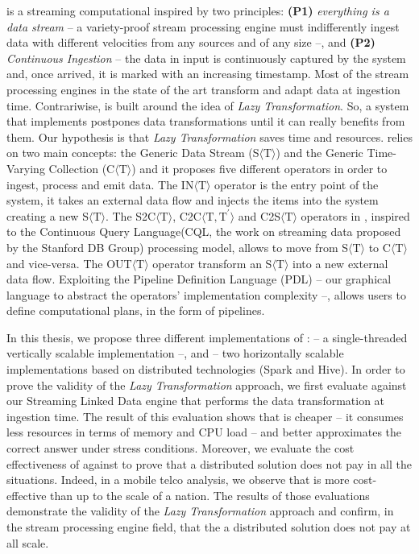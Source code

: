 \river{} is a streaming computational inspired by two principles: \textbf{(P1)} \textit{everything is a data stream} -- a variety-proof stream processing engine must indifferently ingest data with different velocities from any sources and of any size --, and \textbf{(P2)} \textit{Continuous Ingestion} -- the data in input is continuously captured by the system and, once arrived, it is marked with an increasing timestamp.
Most of the stream processing engines in the state of the art transform and adapt data at ingestion time.
Contrariwise, \river{} is built around the idea of \textit{Lazy Transformation}.
So, a system that implements \river{} postpones data transformations until it can really benefits from them.
Our hypothesis is that \textit{Lazy Transformation} saves time and resources.
\river{} relies on two main concepts: the Generic Data Stream (S$\langle\mathrm{T}\rangle$) and the Generic Time-Varying Collection (C$\langle\mathrm{T}\rangle$) and it proposes five different operators in order to ingest, process and emit data.
The IN$\langle\mathrm{T}\rangle$ operator is the entry point of the system, it takes an external data flow and injects the items into the system creating a new S$\langle\mathrm{T}\rangle$.
The S2C$\langle\mathrm{T}\rangle$, C2C$\langle\mathrm{T},\mathrm{T^{\prime}}\rangle$ and C2S$\langle\mathrm{T}\rangle$ operators in \river{}, inspired to the Continuous Query Language(CQL, the work on streaming data proposed by the Stanford DB Group) processing model, allows to move from S$\langle\mathrm{T}\rangle$ to C$\langle\mathrm{T}\rangle$ and vice-versa.
The OUT$\langle\mathrm{T}\rangle$ operator transform an S$\langle\mathrm{T}\rangle$ into a new external data flow.
Exploiting the Pipeline Definition Language (PDL) -- our graphical language to abstract the operators' implementation complexity --, \river{} allows users to define computational plans, in the form of pipelines.

In this thesis, we propose three different implementations of \river{}: \sti{} -- a single-threaded vertically scalable implementation --, \sparkdi{} and \hivedi{} -- two horizontally scalable implementations based on distributed technologies (Spark and Hive).
In order to prove the validity of the \textit{Lazy Transformation} approach, we first evaluate \sti{} against our Streaming Linked Data engine that performs the data transformation at ingestion time. The result of this evaluation shows that \sti{} is cheaper -- it consumes less resources in terms of memory and CPU load -- and better approximates the correct answer under stress conditions.
Moreover, we evaluate the cost effectiveness of \sti{} against \sparkdi{} to prove that a distributed solution does not pay in all the situations.
Indeed, in a mobile telco analysis, we observe that \sti{} is more cost-effective than \sparkdi{} up to the scale of a nation.
The results of those evaluations demonstrate the validity of the \textit{Lazy Transformation} approach and confirm, in the stream processing engine field, that the a distributed solution does not pay at all scale.


